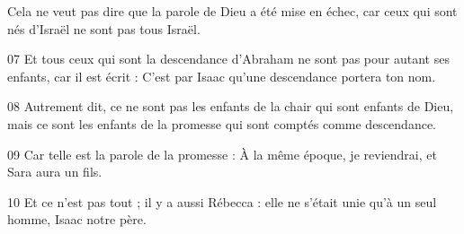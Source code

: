 Cela ne veut pas dire que la parole de Dieu a été mise en échec, car ceux qui sont nés d’Israël ne sont pas tous Israël.

07 Et tous ceux qui sont la descendance d’Abraham ne sont pas pour autant ses enfants, car il est écrit : C’est par Isaac qu’une descendance portera ton nom.

08 Autrement dit, ce ne sont pas les enfants de la chair qui sont enfants de Dieu, mais ce sont les enfants de la promesse qui sont comptés comme descendance.

09 Car telle est la parole de la promesse : À la même époque, je reviendrai, et Sara aura un fils.

10 Et ce n’est pas tout ; il y a aussi Rébecca : elle ne s’était unie qu’à un seul homme, Isaac notre père.